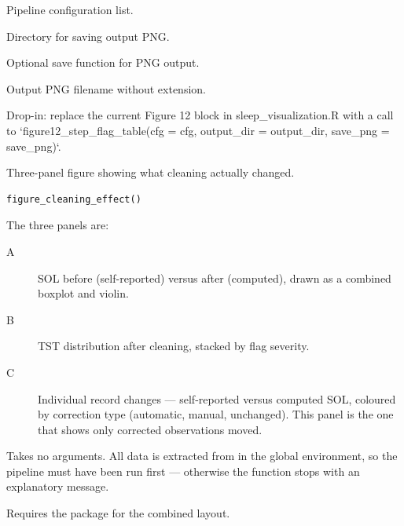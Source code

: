 \documentclass[a4paper]{book}
\begin{document}
%
\begin{Arguments}
\begin{ldescription}
\item[\code{cfg}] Pipeline configuration list.

\item[\code{output\_dir}] Directory for saving output PNG.

\item[\code{save\_png}] Optional save function for PNG output.

\item[\code{filename}] Output PNG filename without extension.
\end{ldescription}
\end{Arguments}
%
\begin{Details}
Drop-in: replace the current Figure 12 block in sleep\_visualization.R with a
call to `figure12\_step\_flag\_table(cfg = cfg, output\_dir = output\_dir, save\_png = save\_png)`.
\end{Details}
%
\begin{Description}
Three-panel figure showing what cleaning actually changed.
\end{Description}
%
\begin{Usage}
\begin{verbatim}
figure_cleaning_effect()
\end{verbatim}
\end{Usage}
%
\begin{Details}
The three panels are:
\begin{description}

\item[A] SOL before (self-reported) versus after (computed), drawn as a
combined boxplot and violin.
\item[B] TST distribution after cleaning, stacked by flag severity.
\item[C] Individual record changes --- self-reported versus computed SOL,
coloured by correction type (automatic, manual, unchanged). This panel
is the one that shows only corrected observations moved.

\end{description}


Takes no arguments. All data is extracted from  in
the global environment, so the pipeline must have been run first ---
otherwise the function stops with an explanatory message.

Requires the  package for the combined layout.
\end{Details}
\end{document}
